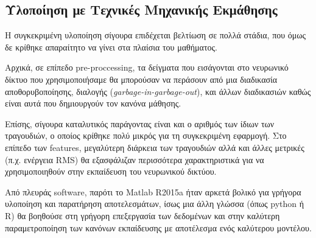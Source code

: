 \subsection{Υλοποίηση με Τεχνικές Μηχανικής Εκμάθησης}
Η συγκεκριμένη υλοποίηση σίγουρα επιδέχεται βελτίωση σε πολλά στάδια, που όμως δε κρίθηκε απαραίτητο να γίνει στα πλαίσια του μαθήματος. 

Αρχικά, σε επίπεδο pre-proccessing, τα δείγματα που εισάγονται στο νευρωνικό δίκτυο που χρησιμοποιήσαμε θα μπορούσαν να περάσουν από μια διαδικασία αποθορυβοποίησης, διαλογής (\textit{garbage-in-garbage-out}), και άλλων διαδικασιών καθώς είναι αυτά που δημιουργούν τον κανόνα μάθησης.

Επίσης, σίγουρα καταλυτικός παράγοντας είναι και ο αριθμός των ίδιων των τραγουδιών, ο οποίος κρίθηκε πολύ μικρός για τη συγκεκριμένη εφαρμογή. 
Στο επίπεδο των features, μεγαλύτερη διάρκεια των τραγουδιών αλλά και άλλες μετρικές (π.χ. ενέργεια RMS) θα εξασφάλιζαν περισσότερα χαρακτηριστικά για να χρησιμοποιηθούν στην εκπαίδευση του νευρωνικού δικτύου.

Από πλευράς software, παρότι το Matlab R2015a \cite{matlab} ήταν αρκετά βολικό για γρήγορα υλοποίηση και παρατήρηση αποτελεσμάτων, ίσως μια άλλη γλώσσα (όπως python ή R) θα βοηθούσε στη γρήγορη επεξεργασία των δεδομένων και στην καλύτερη παραμετροποίηση των κανόνων εκπαίδευσης με αποτέλεσμα ενός καλύτερου μοντέλου.